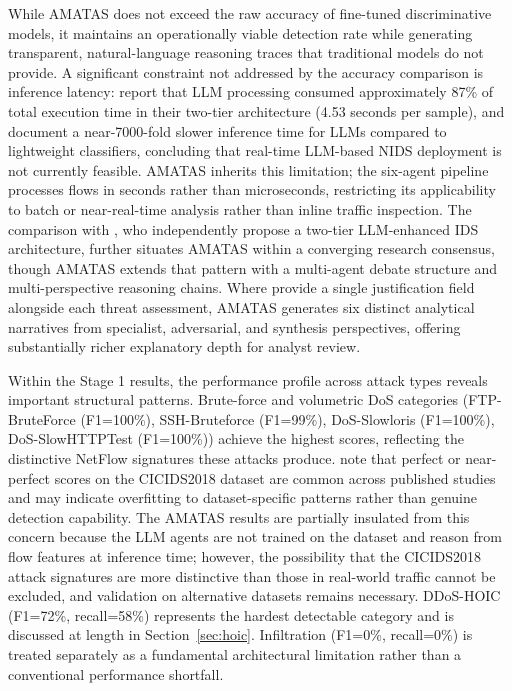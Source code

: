 \documentclass[../main.tex]{subfiles}
\begin{document}
While AMATAS does not exceed the raw accuracy of fine-tuned discriminative models, it maintains an operationally viable detection rate while generating transparent, natural-language reasoning traces that traditional models do not provide. A significant constraint not addressed by the accuracy comparison is inference latency: \textcite{Kalafatidis2025} report that LLM processing consumed approximately 87\% of total execution time in their two-tier architecture (4.53 seconds per sample), and \textcite{Houssel2024} document a near-7000-fold slower inference time for LLMs compared to lightweight classifiers, concluding that real-time LLM-based NIDS deployment is not currently feasible. AMATAS inherits this limitation; the six-agent pipeline processes flows in seconds rather than microseconds, restricting its applicability to batch or near-real-time analysis rather than inline traffic inspection. The comparison with \textcite{Kalafatidis2025}, who independently propose a two-tier LLM-enhanced IDS architecture, further situates AMATAS within a converging research consensus, though AMATAS extends that pattern with a multi-agent debate structure and multi-perspective reasoning chains. Where \textcite{Kalafatidis2025} provide a single justification field alongside each threat assessment, AMATAS generates six distinct analytical narratives from specialist, adversarial, and synthesis perspectives, offering substantially richer explanatory depth for analyst review.

Within the Stage 1 results, the performance profile across attack types reveals important structural patterns. Brute-force and volumetric DoS categories (FTP-BruteForce (F1=100\%), SSH-Bruteforce (F1=99\%), DoS-Slowloris (F1=100\%), DoS-SlowHTTPTest (F1=100\%)) achieve the highest scores, reflecting the distinctive NetFlow signatures these attacks produce. \textcite{Leevy2020} note that perfect or near-perfect scores on the CICIDS2018 dataset are common across published studies and may indicate overfitting to dataset-specific patterns rather than genuine detection capability. The AMATAS results are partially insulated from this concern because the LLM agents are not trained on the dataset and reason from flow features at inference time; however, the possibility that the CICIDS2018 attack signatures are more distinctive than those in real-world traffic cannot be excluded, and validation on alternative datasets remains necessary. DDoS-HOIC (F1=72\%, recall=58\%) represents the hardest detectable category and is discussed at length in Section~\ref{sec:hoic}. Infiltration (F1=0\%, recall=0\%) is treated separately as a fundamental architectural limitation rather than a conventional performance shortfall.
\end{document}
